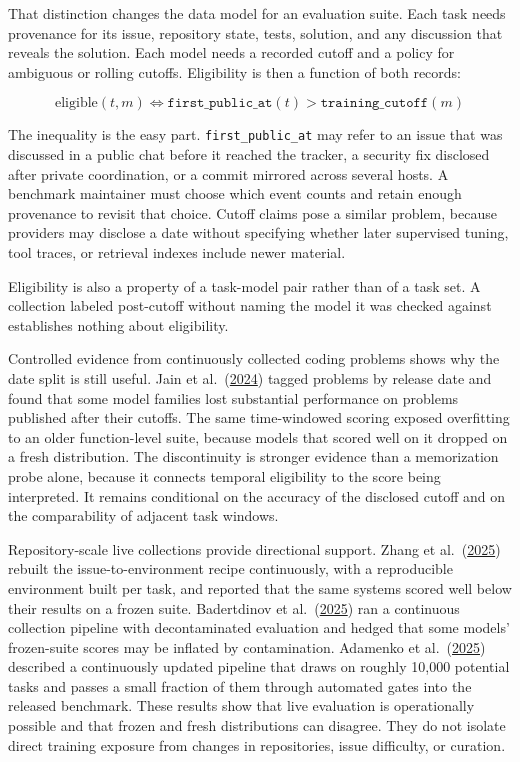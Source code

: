That distinction changes the data model for an evaluation suite. Each task needs provenance for its issue, repository state, tests, solution, and any discussion that reveals the solution. Each model needs a recorded cutoff and a policy for ambiguous or rolling cutoffs. Eligibility is then a function of both records:

\[
  \text{eligible}(t, m) \iff \texttt{first\_public\_at}(t) > \texttt{training\_cutoff}(m)
\]

The inequality is the easy part. \texttt{first\_public\_at} may refer to an issue that was discussed in a public chat before it reached the tracker, a security fix disclosed after private coordination, or a commit mirrored across several hosts. A benchmark maintainer must choose which event counts and retain enough provenance to revisit that choice. Cutoff claims pose a similar problem, because providers may disclose a date without specifying whether later supervised tuning, tool traces, or retrieval indexes include newer material.

Eligibility is also a property of a task-model pair rather than of a task set. A collection labeled post-cutoff without naming the model it was checked against establishes nothing about eligibility.

Controlled evidence from continuously collected coding problems shows why the date split is still useful. Jain et al.~(\href{https://arxiv.org/abs/2403.07974}{2024}) tagged problems by release date and found that some model families lost substantial performance on problems published after their cutoffs. The same time-windowed scoring exposed overfitting to an older function-level suite, because models that scored well on it dropped on a fresh distribution. The discontinuity is stronger evidence than a memorization probe alone, because it connects temporal eligibility to the score being interpreted. It remains conditional on the accuracy of the disclosed cutoff and on the comparability of adjacent task windows.

Repository-scale live collections provide directional support. Zhang et al.~(\href{https://arxiv.org/abs/2505.23419}{2025}) rebuilt the issue-to-environment recipe continuously, with a reproducible environment built per task, and reported that the same systems scored well below their results on a frozen suite. Badertdinov et al.~(\href{https://arxiv.org/abs/2505.20411}{2025}) ran a continuous collection pipeline with decontaminated evaluation and hedged that some models' frozen-suite scores may be inflated by contamination. Adamenko et al.~(\href{https://arxiv.org/abs/2507.11059}{2025}) described a continuously updated pipeline that draws on roughly 10,000 potential tasks and passes a small fraction of them through automated gates into the released benchmark. These results show that live evaluation is operationally possible and that frozen and fresh distributions can disagree. They do not isolate direct training exposure from changes in repositories, issue difficulty, or curation.

